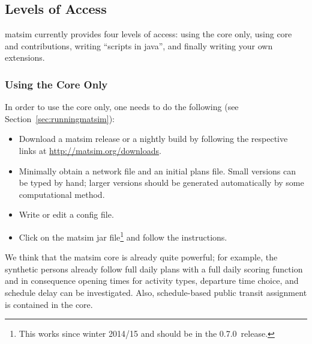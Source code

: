 \subsection{Levels of Access}
\label{sec:levels-of-access}
\gls{matsim} currently provides four levels of access: using the core only, using core and \glspl{contribution}, writing ``scripts in \gls{java}'', and finally writing your own \glspl{extension}.

\subsubsection{Using the Core Only}
\label{sec:using-core-only}


In order to use the core only, one needs to do the following (see Section~\ref{sec:runningmatsim}):
\begin{itemize}\styleItemize
\item Download a \gls{matsim} release or a nightly build by following the respective links at %
\url{http://matsim.org/downloads}.
\item Minimally obtain a network file and an initial plans file.  Small versions can be typed by hand; larger versions should be generated automatically by some computational method.
\item Write or edit a config file.
\item Click on the \gls{matsim} jar file\footnote{This works since winter 2014/15 and should be in the 0.7.0~release.} and follow the instructions. 
\end{itemize}
We think that the \gls{matsim} core is already quite powerful; for example, the synthetic persons already follow full daily plans with a full daily scoring function and in consequence opening times for activity types, departure time choice, and schedule delay can be investigated. Also, schedule-based public transit assignment is contained in the core.

